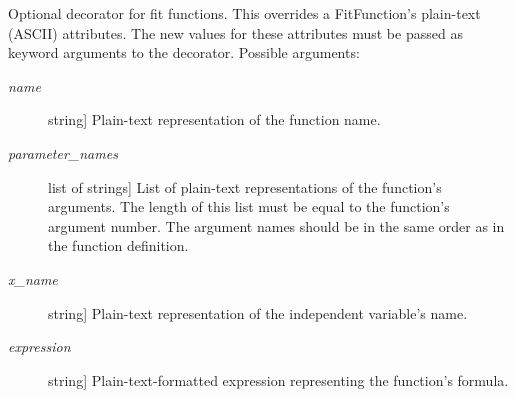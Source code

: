 \documentclass[a4paper,10pt,english]{sphinxmanual}
\begin{document}
\begin{fulllineitems}
\label{index:kafe.function_tools.ASCII}
Optional decorator for fit functions. This overrides a FitFunction's
plain-text (ASCII) attributes. The new values for these attributes must be
passed as keyword arguments to the decorator. Possible arguments:
\begin{description}
\item[{\emph{name}}] \leavevmode{[}string{]}
Plain-text representation of the function name.

\item[{\emph{parameter\_names}}] \leavevmode{[}list of strings{]}
List of plain-text representations of the function's arguments.
The length of this list must be equal to the function's argument
number. The argument names should be in the same order as in the
function definition.

\item[{\emph{x\_name}}] \leavevmode{[}string{]}
Plain-text representation of the independent variable's name.

\item[{\emph{expression}}] \leavevmode{[}string{]}
Plain-text-formatted expression representing the
function's formula.

\end{description}

\end{fulllineitems}

\end{document}
